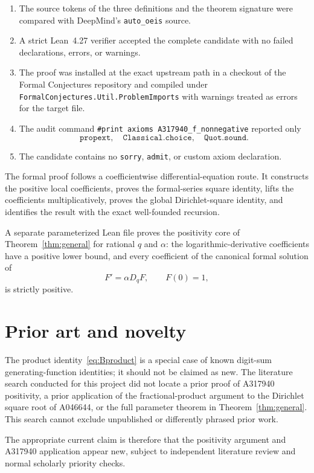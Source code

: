 \documentclass[11pt]{article}
\theoremstyle{definition}
\theoremstyle{remark}
\begin{document}
\begin{enumerate}[label=(\arabic*)]
  \item The source tokens of the three definitions and the theorem signature were compared with DeepMind's \texttt{auto\_oeis} source.
  \item A strict Lean~4.27 verifier accepted the complete candidate with no failed declarations, errors, or warnings.
  \item The proof was installed at the exact upstream path in a checkout of the Formal Conjectures repository and compiled under \texttt{FormalConjectures.Util.ProblemImports} with warnings treated as errors for the target file.
  \item The audit command \texttt{\#print axioms A317940\_f\_nonnegative} reported only
  \[
    \texttt{propext},\quad \texttt{Classical.choice},\quad \texttt{Quot.sound}.
  \]
  \item The candidate contains no \texttt{sorry}, \texttt{admit}, or custom axiom declaration.
\end{enumerate}

The formal proof follows a coefficientwise differential-equation route.  It constructs the positive local coefficients, proves the formal-series square identity, lifts the coefficients multiplicatively, proves the global Dirichlet-square identity, and identifies the result with the exact well-founded recursion.

A separate parameterized Lean file proves the positivity core of Theorem~\ref{thm:general} for rational $q$ and $\alpha$: the logarithmic-derivative coefficients have a positive lower bound, and every coefficient of the canonical formal solution of
\[
  F'=\alpha D_qF,\qquad F(0)=1,
\]
is strictly positive.

\section{Prior art and novelty}

The product identity~\eqref{eq:Bproduct} is a special case of known digit-sum generating-function identities; it should not be claimed as new.  The literature search conducted for this project did not locate a prior proof of A317940 positivity, a prior application of the fractional-product argument to the Dirichlet square root of A046644, or the full parameter theorem in Theorem~\ref{thm:general}.  This search cannot exclude unpublished or differently phrased prior work.

The appropriate current claim is therefore that the positivity argument and A317940 application appear new, subject to independent literature review and normal scholarly priority checks.
\end{document}
